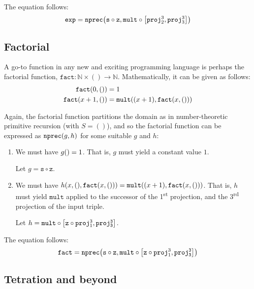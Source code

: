 The equation follows:\begin{align*}
%
\mathtt{exp} = \mathtt{nprec}\p{\mathtt{s} \circ \mathtt{z}, \mathtt{mult}
\circ \seq{\mathtt{proj}^3_2, \mathtt{proj}^3_3}}
%
\end{align*}

\subsection{Factorial}

A go-to function in any new and exciting programming language is perhaps the
factorial function, $\mathtt{fact} : \mathbb{N} \times () \rightarrow
\mathbb{N}$.  Mathematically, it can be given as follows:\begin{align*}
%
\mathtt{fact}\p{0,()} &= 1 \\
%
\mathtt{fact}\p{x+1,()} &= \mathtt{mult}\p{\p{x+1}, \mathtt{fact}\p{x,()}}
%
\end{align*}

Again, the factorial function partitions the domain as in number-theoretic
primitive recursion (with $S = ()$), and so the factorial function can be expressed as
$\mathtt{nprec}{\mathopen{}\left({g,h}\right)\mathclose{}}$ for some suitable $g$ and $h$:

\begin{enumerate}[label=(\arabic*)]

\item We must have $g{\mathopen{}\left({}\right)\mathclose{}} = 1$. That is, $g$ must yield a constant value $1$.

Let $g = \mathtt{s} \circ \mathtt{z}$.

\item We must have $h{\mathopen{}\left({x,(),\mathtt{fact}{\mathopen{}\left({x,()}\right)\mathclose{}}}\right)\mathclose{}} = \mathtt{mult}{\mathopen{}\left({{\mathopen{}\left({x+1}\right)\mathclose{}},
\mathtt{fact}{\mathopen{}\left({x,()}\right)\mathclose{}}}\right)\mathclose{}}$. That is, $h$ must yield $\mathtt{mult}$ applied to the
successor of the 1\textsuperscript{st} projection, and the
3\textsuperscript{rd} projection of the input triple.

Let $h = \mathtt{mult} \circ \mathopen{}\left[{\mathtt{z} \circ \mathtt{proj}^3_1,
\mathtt{proj^3_3}}\right]\mathclose{}$.

\end{enumerate}

The equation follows:\begin{align*}
%
\mathtt{fact} = \mathtt{nprec}\p{\mathtt{s} \circ \mathtt{z},
\mathtt{mult} \circ \seq{\mathtt{z} \circ \mathtt{proj}^3_1, \mathtt{proj^3_3}}}
%
\end{align*}

\subsection{Tetration and beyond}

